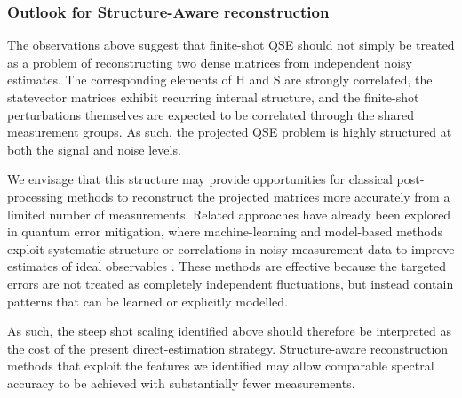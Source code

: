 \subsubsection{Outlook for Structure-Aware reconstruction}
The observations above suggest that finite-shot QSE should not simply be treated as a problem of reconstructing two dense matrices from independent noisy estimates. 
The corresponding elements of H and S are strongly correlated, the statevector matrices exhibit recurring internal structure, and the finite-shot perturbations themselves are expected to be correlated through the shared measurement groups. 
As such, the projected QSE problem is highly structured at both the signal and noise levels.

We envisage that this structure may provide opportunities for classical post-processing methods to reconstruct the projected matrices more accurately from a limited number of measurements. 
Related approaches have already been explored in quantum error mitigation, where machine-learning and model-based methods exploit systematic structure or correlations in noisy measurement data to improve estimates of ideal observables \cite{Liao2024MLQEM, Aasen2025ReadoutMitigation}. 
These methods are effective because the targeted errors are not treated as completely independent fluctuations, but instead contain patterns that can be learned or explicitly modelled. 

As such, the steep shot scaling identified above should therefore be interpreted as the cost of the present direct-estimation strategy. 
Structure-aware reconstruction methods that exploit the features we identified may allow comparable spectral accuracy to be achieved with substantially fewer measurements.
